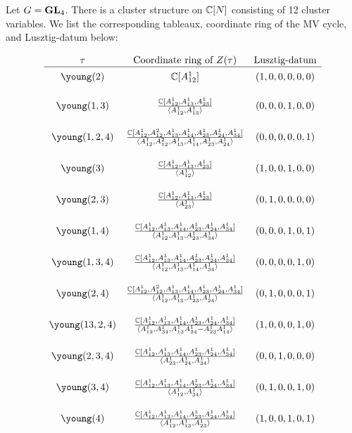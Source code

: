 \documentclass{article} %
\begin{document}
Let $G = {\mathbf{GL}}_4$. There is a cluster structure on $\mathbb C[N]$ consisting of 12 cluster variables. We list the corresponding tableaux, coordinate ring of the MV cycle, and Lusztig-datum below:

\[
\begin{array}{ccc} 
\tau & \text{Coordinate ring of }Z(\tau) & \text{Lusztig-datum} \\ \hline
\young(2) & \CC[A_{12}^1] & (1,0,0,0,0,0) \rule{0pt}{3ex}\\
\young(1,3) & \frac{\CC[A_{12}^1,A_{13}^1,A_{23}^1]}{\langle A_{12}^1,A_{13}^1 \rangle} & (0,0,0,1,0,0) \TS\BS\\
\young(1,2,4) & \frac{\CC[A_{12}^1,A_{12}^2,A_{13}^1,A_{14}^1,A_{23}^1,A_{24}^1,A_{34}^1]}{\langle A_{12}^1,A_{12}^2,A_{13}^1,A_{14}^1,A_{23}^1,A_{24}^1 \rangle} & (0,0,0,0,0,1) \TS\BS\\
\young(3) & \frac{\CC[A_{12}^1,A_{13}^1,A_{23}^1]}{\langle A_{12}^1 \rangle} & (1,0,0,1,0,0) \TS\BS\\
\young(2,3) & \frac{\CC[A_{12}^1,A_{13}^1,A_{23}^1]}{\langle A_{23}^1 \rangle} & (0,1,0,0,0,0) \TS\BS\\
\young(1,4) & \frac{\CC[A_{12}^1,A_{13}^1,A_{14}^1,A_{23}^1,A_{24}^1,A_{34}^1]}{\langle A_{12}^1,A_{13}^1,A_{23}^1,A_{34}^1 \rangle} & (0,0,0,1,0,1) \TS\BS\\
\young(1,3,4) & \frac{\CC[A_{12}^1,A_{13}^1,A_{14}^1,A_{23}^1,A_{24}^1,A_{34}^1]}{\langle A_{12}^1,A_{13}^1,A_{14}^1,A_{34}^1 \rangle} & (0,0,0,0,1,0) \TS\BS\\
\young(2,4) & \frac{\CC[A_{12}^1,A_{12}^2,A_{13}^1,A_{14}^1,A_{23}^1,A_{24}^1,A_{34}^1]}{\langle A_{12}^1,A_{13}^1,A_{23}^1,A_{24}^1 \rangle} & (0,1,0,0,0,1) \TS\BS\\
\young(13,2,4) & \frac{\CC[A_{12}^1,A_{13}^1,A_{14}^1,A_{23}^1,A_{24}^1,A_{34}^1]}{\langle A_{12}^1,A_{34}^1,A_{13}^1A_{24}^1-A_{23}^1A_{14}^1 \rangle} & (1,0,0,0,1,0) \TS\BS\\
\young(2,3,4) & \frac{\CC[A_{12}^1,A_{13}^1,A_{14}^1,A_{23}^1,A_{24}^1,A_{34}^1]}{\langle A_{23}^1,A_{24}^1,A_{34}^1 \rangle} & (0,0,1,0,0,0) \TS\BS\\
\young(3,4) & \frac{\CC[A_{12}^1,A_{13}^1,A_{14}^1,A_{23}^1,A_{24}^1,A_{34}^1]}{\langle A_{12}^1,A_{34}^1 \rangle} & (0,1,0,0,1,0) \TS\BS\\
\young(4) & \frac{\CC[A_{12}^1,A_{13}^1,A_{14}^1,A_{23}^1,A_{24}^1,A_{34}^1]}{\langle A_{12}^1,A_{13}^1,A_{23}^1 \rangle} & (1,0,0,1,0,1) \TS\BS\\
\end{array}
\]
\end{document}
